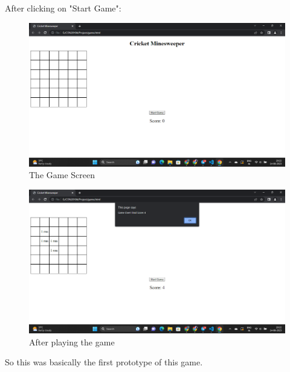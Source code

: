 \documentclass{article}
\begin{document}
After clicking on "Start Game":

\begin{figure}
[H]
   \includegraphics[width=\linewidth]{Screenshot (218).png}
   \caption{The Game Screen}
\end{figure}
\begin{figure}
[H]
   \includegraphics[width=\linewidth]{Screenshot (220).png}
   \caption{After playing the game}
\end{figure}

So this was basically the first prototype of this game.
\maketitle
\end{document}

